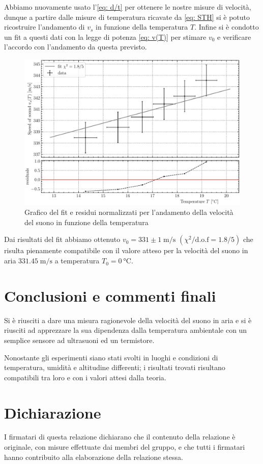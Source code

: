 \documentclass[10pt, a4paper, italian]{article}
\begin{document}
Abbiamo nuovamente usato l'\cref{eq: d/t} per ottenere le nostre misure di
velocità, dunque a partire dalle misure di temperatura ricavate da
\cref{eq: STH} si è potuto ricostruire l'andamento di $v_s$ in funzione
della temperatura $T$. Infine si è condotto un fit a questi dati con la legge
di potenza \cref{eq: v(T)} per stimare $v_0$ e verificare l'accordo con
l'andamento da questa previsto.
\begin{figure}[htbp]
    \centering
	\includegraphics[width=\textwidth]{temptime}
    \caption{Grafico del fit e residui normalizzati per l'andamento della
    velocità del suono in funzione della temperatura}
\end{figure}

Dai risultati del fit abbiamo ottenuto $v_0 = 331 \pm 1 \; \si{\m/\s}$
$(\chi^2/\text{d.o.f} = 1.8/5)$ che risulta pienamente compatibile con il
valore atteso per la velocità del suono in aria $331.45 \; \si{\m/\s}$ a
temperatura $T_0 = \SI{0}{\degreeCelsius}$. 

\section*{Conclusioni e commenti finali}
Si è riusciti a dare una misura ragionevole della velocità del suono in aria
e si è riusciti ad apprezzare la sua dipendenza dalla temperatura ambientale
con un semplice sensore ad ultrasuoni ed un termistore.

Nonostante gli esperimenti siano stati svolti in luoghi e condizioni di
temperatura, umidità e altitudine differenti; i risultati trovati risultano
compatibili tra loro e con i valori attesi dalla teoria.

\section*{Dichiarazione}
I firmatari di questa relazione dichiarano che il contenuto della relazione \`e
originale, con misure effettuate dai membri del gruppo, e che tutti i firmatari
hanno contribuito alla elaborazione della relazione stessa.
\end{document}
